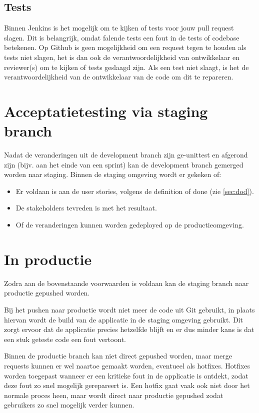 \subsection{Tests}
Binnen Jenkins is het mogelijk om te kijken of tests voor jouw pull request slagen.
Dit is belangrijk, omdat falende tests een fout in de tests of codebase betekenen.
Op Github is geen mogelijkheid om een request tegen te houden als tests niet slagen, het is dan ook de verantwoordelijkheid van ontwikkelaar en reviewer(s) om te kijken of tests geslaagd zijn.
Als een test niet slaagt, is het de verantwoordelijkheid van de ontwikkelaar van de code om dit te repareren.

\section{Acceptatietesting via staging branch}
Nadat de veranderingen uit de development branch zijn ge-unittest en afgerond zijn (bijv. aan het einde van een sprint) kan de development branch gemerged worden naar staging.
Binnen de staging omgeving wordt er gekeken of:
\begin{itemize}
	\item Er voldaan is aan de user stories, volgens de definition of done (zie \cref{sec:dod}).
	\item De stakeholders tevreden is met het resultaat.
	\item Of de veranderingen kunnen worden gedeployed op de productieomgeving.
\end{itemize}

\section{In productie}
Zodra aan de bovenstaande voorwaarden is voldaan kan de staging branch naar productie gepushed worden.
\par
Bij het pushen naar productie wordt niet meer de code uit Git gebruikt, in plaats hiervan wordt de build van de applicatie in de staging omgeving gebruikt.
Dit zorgt ervoor dat de applicatie precies hetzelfde blijft en er dus minder kans is dat een stuk geteste code een fout vertoont.
\par
Binnen de productie branch kan niet direct gepushed worden, maar merge requests kunnen er wel naartoe gemaakt worden, eventueel als hotfixes. Hotfixes worden toegepast wanneer er een kritieke fout in de applicatie is ontdekt, zodat deze fout zo snel mogelijk gerepareert is.
Een hotfix gaat vaak ook niet door het normale proces heen, maar wordt direct naar productie gepushed zodat gebruikers zo snel mogelijk verder kunnen.

